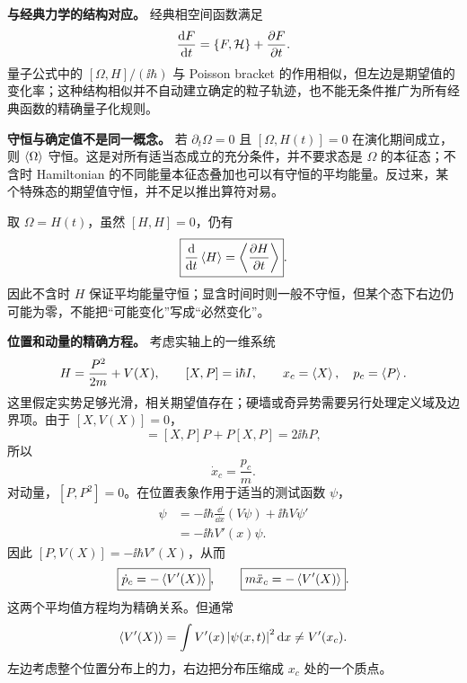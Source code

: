 \textbf{与经典力学的结构对应。}
经典相空间函数满足
\begin{equation}
  \frac{\mathop{}\!\mathrm{d} F}{\mathop{}\!\mathrm{d} t}=\{F,\mathcal H\}+\frac{\partial F}{\partial t}.
\end{equation}
量子公式中的 $[\Omega,H]/(\ii\hbar)$ 与 Poisson bracket 的作用相似，但左边是期望值的变化率；这种结构相似并不自动建立确定的粒子轨迹，也不能无条件推广为所有经典函数的精确量子化规则。

\textbf{守恒与确定值不是同一概念。}
若 $\partial_t\Omega=0$ 且 $[\Omega,H(t)]=0$ 在演化期间成立，则 $\left\langle \Omega \right\rangle$ 守恒。这是对所有适当态成立的充分条件，并不要求态是 $\Omega$ 的本征态；不含时 Hamiltonian 的不同能量本征态叠加也可以有守恒的平均能量。反过来，某个特殊态的期望值守恒，并不足以推出算符对易。

取 $\Omega=H(t)$，虽然 $[H,H]=0$，仍有
\begin{equation}
  \boxed{\frac{\mathop{}\!\mathrm{d} }{\mathop{}\!\mathrm{d} t}\left\langle H \right\rangle=\left\langle \frac{\partial H}{\partial t} \right\rangle}.
  \label{eq:QM-C06-S01-energy-rate}
\end{equation}
因此不含时 $H$ 保证平均能量守恒；显含时间时则一般不守恒，但某个态下右边仍可能为零，不能把“可能变化”写成“必然变化”。



\textbf{位置和动量的精确方程。}
考虑实轴上的一维系统
\begin{equation}
  H=\frac{P^2}{2m}+V(X),\qquad [X,P]=\mathrm{i}\hbar I,
  \qquad x_c=\left\langle X \right\rangle,\quad p_c=\left\langle P \right\rangle.
\end{equation}
这里假定实势足够光滑，相关期望值存在；硬墙或奇异势需要另行处理定义域及边界项。由于 $[X,V(X)]=0$，
\begin{equation}
  [X,P^2]=[X,P]P+P[X,P]=2\ii\hbar P,
\end{equation}
所以
\begin{equation}
  \boxed{\dot x_c=\frac{p_c}{m}}.
  \label{eq:QM-C06-S01-position-rate}
\end{equation}
对动量，$[P,P^2]=0$。在位置表象作用于适当的测试函数 $\psi$，
\begin{align}
  [P,V(X)]\psi
  &=-\ii\hbar\frac{\dd}{\dd x}(V\psi)
      +\ii\hbar V\psi'\\
  &=-\ii\hbar V'(x)\psi.
\end{align}
因此 $[P,V(X)]=-\ii\hbar V'(X)$，从而
\begin{equation}
  \boxed{\dot p_c=-\left\langle V'(X) \right\rangle},\qquad
  \boxed{m\ddot x_c=-\left\langle V'(X) \right\rangle}.
  \label{eq:QM-C06-S01-mean-force}
\end{equation}
这两个平均值方程均为精确关系。但通常
\begin{equation}
  \left\langle V'(X) \right\rangle
  =\int V'(x)\left|\psi(x,t)\right|^2\mathop{}\!\mathrm{d} x
  \ne V'(x_c).
\end{equation}
左边考虑整个位置分布上的力，右边把分布压缩成 $x_c$ 处的一个质点。

